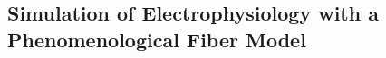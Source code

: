 % 
% 
% 
% 
% 
% 


%

%

\subsection{Simulation of Electrophysiology with a Phenomenological Fiber Model}\label{sec:sim_rosenfalck}

